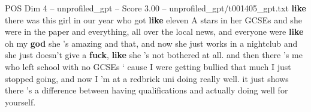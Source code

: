 \begin{textsample}{POS Dim 4 – unprofiled\_gpt – Score 3.00 – unprofiled\_gpt/t001405\_gpt.txt}  \label{ex:f4_pos_024}
\textbf{like} there was this girl in our year who got \textbf{like} eleven A stars in her GCSEs and she were in the paper and everything, all over the local news, and everyone were \textbf{like} oh my \textbf{god} she 's amazing and that, and now she just works in a nightclub and she just doesn't give a \textbf{fuck}, \textbf{like} she ’s not bothered at all. and then there ’s me who left school with no GCSEs ‘ cause I were getting bullied that much I just stopped going, and now I ’m at a redbrick uni doing really well. it just shows there ’s a difference between having qualifications and actually doing well for yourself.

\end{textsample}
